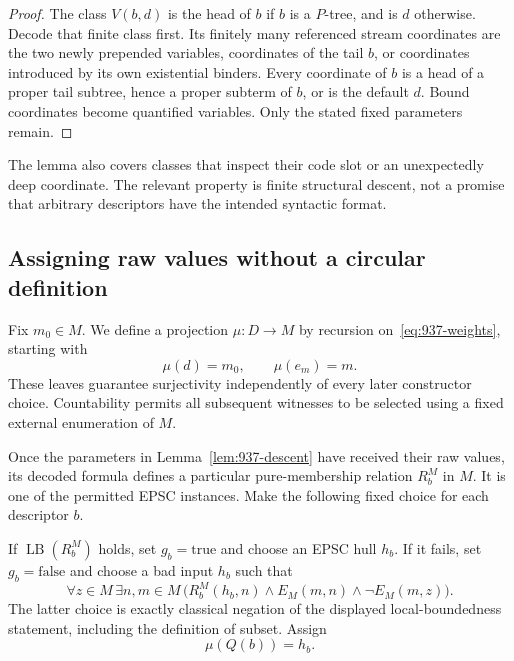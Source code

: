 \begin{proof}
The class \(V(b,d)\) is the head of \(b\) if \(b\) is a \(P\)-tree,
and is \(d\) otherwise.  Decode that finite class first.
Its finitely many referenced stream coordinates are the two newly
prepended variables, coordinates of the tail \(b\), or coordinates
introduced by its own existential binders.  Every coordinate of \(b\)
is a head of a proper tail subtree, hence a proper subterm of \(b\),
or is the default \(d\).  Bound coordinates become quantified
variables.  Only the stated fixed parameters remain.
\end{proof}

The lemma also covers classes that inspect their code slot or an
unexpectedly deep coordinate.  The relevant property is finite
structural descent, not a promise that arbitrary descriptors have
the intended syntactic format.

\subsection{Assigning raw values without a circular definition}

Fix \(m_0\in M\).  We define a projection \(\mu:D\to M\) by recursion
on~\eqref{eq:937-weights}, starting with
\[
                   \mu(d)=m_0,\qquad \mu(e_m)=m.
\]
These leaves guarantee surjectivity independently of every later
constructor choice.  Countability permits all subsequent witnesses
to be selected using a fixed external enumeration of \(M\).

Once the parameters in Lemma~\ref{lem:937-descent} have received
their raw values, its decoded formula defines a particular
pure-membership relation \(R_b^M\) in \(M\).  It is one of the
permitted EPSC instances.  Make the following fixed choice for
each descriptor \(b\).

If \(\operatorname{LB}(R_b^M)\) holds, set \(g_b=\mathrm{true}\)
and choose an EPSC hull \(h_b\).  If it fails, set
\(g_b=\mathrm{false}\) and choose a bad input \(h_b\) such that
\begin{equation}
 \forall z\in M\,\exists n,m\in M\,
 \bigl(R_b^M(h_b,n)\land E_M(m,n)\land\neg E_M(m,z)\bigr).
 \label{eq:937-bad-input}
\end{equation}
The latter choice is exactly classical negation of the displayed
local-boundedness statement, including the definition of subset.
Assign
\begin{equation}
                         \mu(Q(b))=h_b.
                         \label{eq:937-projection-q}
\end{equation}


